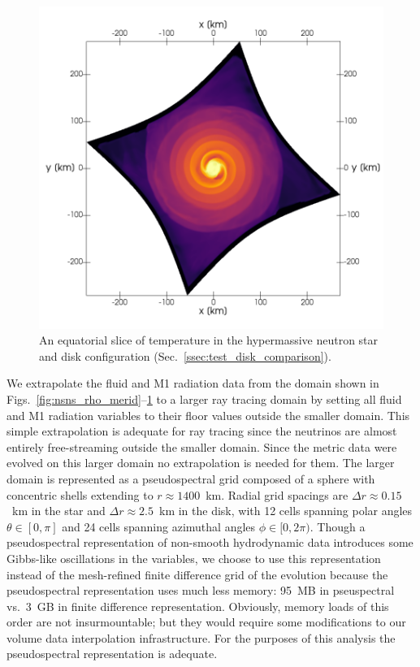 \documentclass[aps,floatfix,prd,superscriptaddress,twocolumn]{revtex4-1}
\begin{document}
\begin{figure}
  \includegraphics[width=\columnwidth]{production-colormap-equat-temp}
  \caption{An equatorial slice of temperature in the hypermassive neutron
    star and disk configuration (Sec.~\ref{ssec:test_disk_comparison}).}
  \label{fig:nsns_temp_equat}
\end{figure}

We extrapolate the fluid and M1 radiation data from
the domain shown in Figs.~\ref{fig:nsns_rho_merid}--\ref{fig:nsns_temp_equat}
to a larger ray tracing domain by setting all fluid and M1 radiation variables
to their floor values outside the smaller domain.
This simple extrapolation is adequate for ray tracing since
the neutrinos are almost entirely free-streaming outside the smaller domain.
Since the metric data were evolved on this larger domain no extrapolation is
needed for them.
The larger domain is represented as a pseudospectral grid
composed of a sphere with concentric shells extending to $r\approx1400$~km.
Radial grid spacings are $\Delta r \approx 0.15$~km in the star
and $\Delta r \approx 2.5$~km in the disk,
with 12 cells spanning polar angles $\theta\in[0,\pi]$
and 24 cells spanning azimuthal angles $\phi\in[0,2\pi)$.
Though a pseudospectral representation of non-smooth hydrodynamic data
introduces some Gibbs-like oscillations in the variables,
we choose to use this representation instead of the mesh-refined
finite difference grid of the evolution because the pseudospectral
representation uses much less memory:
95~MB in pseuspectral vs.\ 3~GB in finite difference representation.
Obviously, memory loads of this order are not insurmountable;
but they would require some modifications to our
volume data interpolation infrastructure.
For the purposes of this analysis the pseudospectral representation is adequate.
\end{document}

